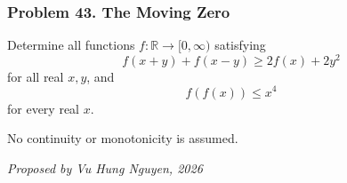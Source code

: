 \subsubsection*{Problem 43. The Moving Zero}

\begin{exercisebox}[hard]

Determine all functions $f:\mathbb R\to[0,\infty)$ satisfying
\[
\boxed{\quad
f(x+y)+f(x-y)\ge 2f(x)+2y^2
\quad} \tag{1}
\]
for all real $x,y$, and
\[
\boxed{\quad f(f(x))\le x^4\quad} \tag{2}
\]
for every real $x$.

No continuity or monotonicity is assumed.

\begin{flushright}
\textit{Proposed by Vu Hung Nguyen, 2026}
\end{flushright}


\end{exercisebox}
